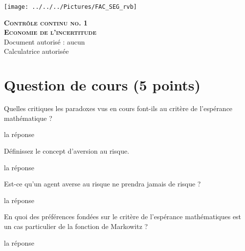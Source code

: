 \documentclass[12pt, a4paper]{exam}
\begin{document}
	\checkboxchar{$\Box$}
	\checkedchar{$\blacksquare$}


\begin{center}
		\texttt{[image: ../../../Pictures/FAC\_SEG\_rvb]}
\end{center}

	\begin{center}
		
		\vspace*{1cm}
		{\textbf{\textsc{\Huge{Contrôle continu  no. 1 \\Economie de l'incertitude}}}}\\
		
		Document autorisé : aucun \\
		Calculatrice autorisée\\
				\vspace*{1cm}
					\end{center}
	\section*{Question de cours (5 points)}
		 
\begin{questions}
\question[1,25] Quelles critiques les paradoxes vus en cours font-ils au critère de l'espérance mathématique ?
	\makeemptybox{4cm}

\begin{solutionorbox}
	la réponse
\end{solutionorbox}

\question[1,25] Définissez le concept d'aversion au risque.
	\makeemptybox{3cm}
	
\begin{solutionorbox}
	la réponse
\end{solutionorbox}	
	
\question[1,25] Est-ce qu'un agent averse au risque ne prendra jamais de risque ?
	\makeemptybox{3cm}
	
\begin{solutionorbox}
	la réponse
\end{solutionorbox}	
	
\question[1,25] En quoi des préférences fondées sur le critère de l'espérance mathématiques est un cas particulier de la fonction de Markowitz ?
\makeemptybox{3cm}

\begin{solutionorbox}
	la réponse
\end{solutionorbox}

\end{questions}
\end{document}
